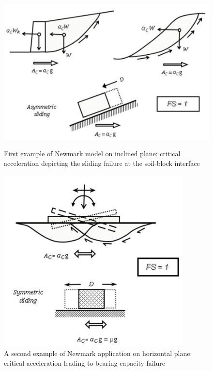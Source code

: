 \documentclass[11pt,a4paper]{report}
\begin{document}
 \begin{figure}[!h]
 	\centering
 	\begin{minipage}[b]{0.45\textwidth}
 		\includegraphics[width=\textwidth]{newmark1}
 		\caption{First example of Newmark model on inclined plane: critical acceleration depicting the sliding failure at the soil-block interface}
 		\label{newmark1}
 	\end{minipage}
 	\hfill
 	\begin{minipage}[b]{0.45\textwidth}
 		\includegraphics[width=\textwidth]{newmark2}
 		\caption{A second example of Newmark application on horizontal plane: critical acceleration leading to bearing capacity failure}
 		\label{newmark2}
 	\end{minipage}
 \end{figure}
 
\end{document}
